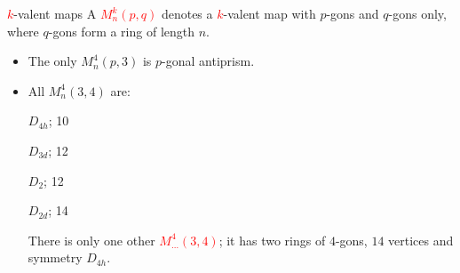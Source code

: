 \documentclass[%
pdf,
colorBG,
slideColor,
]{prosper}
\begin{document}
\begin{slide}{\textcolor{red}{$k$}-valent maps}
A \textcolor{red}{$M^k_n(p,q)$} denotes a \textcolor{red}{$k$}-valent map with $p$-gons and $q$-gons only, where $q$-gons form a ring of length $n$.

\begin{itemize}
\item The only $M^4_{n}(p,3)$ is $p$-gonal antiprism.
\item All $M^4_n(3,4)$ are:
\begin{center}
\begin{minipage}{2.6cm}
\centering
\epsfxsize=2.2cm
\par
$D_{4h}$; 10
\end{minipage}
\begin{minipage}{2.6cm}
\centering
\epsfxsize=2.2cm
\par
$D_{3d}$; 12
\end{minipage}
\begin{minipage}{2.6cm}
\centering
\epsfxsize=2.2cm
\par
$D_{2}$; 12
\end{minipage}
\begin{minipage}{2.6cm}
\centering
\epsfxsize=2.2cm
\par
$D_{2d}$; 14
\end{minipage}
\end{center}
There is only one other \textcolor{red}{$M^4_{\dots}(3,4)$}; it has two rings of $4$-gons, $14$ vertices and symmetry $D_{4h}$.


\end{itemize}



\end{slide}
\end{document}
